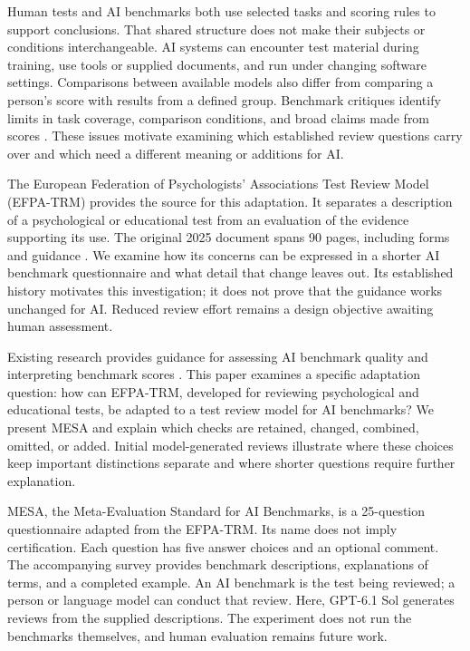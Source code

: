 \documentclass[10pt,conference]{IEEEtran}
\begin{document}
Human tests and AI benchmarks both use selected tasks and scoring rules to support conclusions. That shared structure does not make their subjects or conditions interchangeable. AI systems can encounter test material during training, use tools or supplied documents, and run under changing software settings. Comparisons between available models also differ from comparing a person's score with results from a defined group. Benchmark critiques identify limits in task coverage, comparison conditions, and broad claims made from scores \cite{jo_wilson_what_does_your_benchmark_measure,singh_leaderboard_illusion}. These issues motivate examining which established review questions carry over and which need a different meaning or additions for AI.

The European Federation of Psychologists' Associations Test Review Model (EFPA-TRM) provides the source for this adaptation. It separates a description of a psychological or educational test from an evaluation of the evidence supporting its use. The original 2025 document spans 90 pages, including forms and guidance \cite{efpa_test_review_model_2025}. We examine how its concerns can be expressed in a shorter AI benchmark questionnaire and what detail that change leaves out. Its established history motivates this investigation; it does not prove that the guidance works unchanged for AI. Reduced review effort remains a design objective awaiting human assessment.

Existing research provides guidance for assessing AI benchmark quality and interpreting benchmark scores \cite{reuel_betterbench,bean_measuring_what_matters,jo_wilson_what_does_your_benchmark_measure}. This paper examines a specific adaptation question: how can EFPA-TRM, developed for reviewing psychological and educational tests, be adapted to a test review model for AI benchmarks? We present MESA and explain which checks are retained, changed, combined, omitted, or added. Initial model-generated reviews illustrate where these choices keep important distinctions separate and where shorter questions require further explanation.

MESA, the Meta-Evaluation Standard for AI Benchmarks, is a 25-question questionnaire adapted from the EFPA-TRM. Its name does not imply certification. Each question has five answer choices and an optional comment. The accompanying survey provides benchmark descriptions, explanations of terms, and a completed example. An AI benchmark is the test being reviewed; a person or language model can conduct that review. Here, GPT-6.1 Sol generates reviews from the supplied descriptions. The experiment does not run the benchmarks themselves, and human evaluation remains future work.
\end{document}
